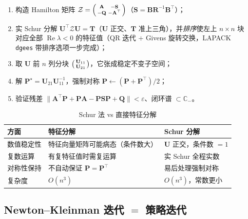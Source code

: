 \begin{algo}\label{algo:lqr-schur}
\begin{enumerate}
  \item 构造 Hamilton 矩阵 $\mathcal Z=\begin{psmallmatrix}\mathbf A&-\mathbf S\\-\mathbf Q&-\mathbf A^\top\end{psmallmatrix}$（$\mathbf S=\mathbf B\mathbf R^{-1}\mathbf B^\top$）；
  \item 实 Schur 分解 $\mathbf U^\top\mathcal Z\mathbf U=\mathbf T$（$\mathbf U$ 正交、$\mathbf T$ 准上三角），并\emph{排序}使左上 $n\times n$ 块对应全部 $\operatorname{Re}\lambda<0$ 的特征值（QR 迭代 $+$ Givens 旋转交换，LAPACK \texttt{dgees} 带排序选项一步完成）；
  \item 取 $\mathbf U$ 前 $n$ 列分块 $\begin{psmallmatrix}\mathbf U_{11}\\\mathbf U_{21}\end{psmallmatrix}$，它张成稳定不变子空间；
  \item 解 $\mathbf P^\star=\mathbf U_{21}\mathbf U_{11}^{-1}$，强制对称 $\mathbf P\leftarrow(\mathbf P+\mathbf P^\top)/2$；
  \item 验证残差 $\|\mathbf A^\top\mathbf P+\mathbf P\mathbf A-\mathbf P\mathbf S\mathbf P+\mathbf Q\|<\varepsilon$、闭环谱 $\subset\mathbb C_-$。
\end{enumerate}
\end{algo}

\begin{table}[H]\centering\small
\caption{Schur 法 vs 直接特征分解}
\label{tab:lqr-schur-vs-eig}
\begin{tabular}{lll}
\toprule
方面 & 特征分解 & Schur 分解 \\
\midrule
数值稳定性 & 特征向量矩阵可能病态（条件数大） & $\mathbf U$ 正交，条件数 $=1$ \\
复数运算 & 有复特征值时需复运算 & 实 Schur 全程实数 \\
对称性保持 & 不自动保证 $\mathbf P=\mathbf P^\top$ & 易后处理强制对称 \\
复杂度 & $O(n^3)$ & $O(n^3)$，常数更小 \\
\bottomrule
\end{tabular}
\end{table}

\subsection{Newton--Kleinman 迭代 \texorpdfstring{$=$}{=} 策略迭代}
\label{sec:lqr-newton-kleinman}


